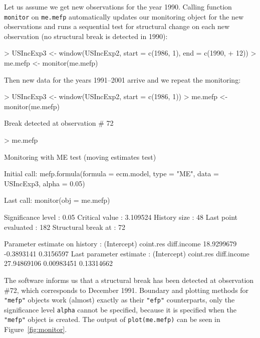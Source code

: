 \documentclass[10pt,a4paper]{article}
\begin{document}
Let us assume we get new observations for the year 1990. Calling function
\texttt{monitor} on \texttt{me.mefp} automatically updates our
monitoring object for the new observations and runs a sequential test
for structural change on each new observation (no structural break is
detected in 1990):
\begin{Schunk}
\begin{Sinput}
> USIncExp3 <- window(USIncExp2, start = c(1986, 1), end = c(1990, 
+     12))
> me.mefp <- monitor(me.mefp)
\end{Sinput}
\end{Schunk}
Then new data for the years 1991--2001 arrive and we repeat the
monitoring:
\begin{Schunk}
\begin{Sinput}
> USIncExp3 <- window(USIncExp2, start = c(1986, 1))
> me.mefp <- monitor(me.mefp)
\end{Sinput}
\begin{Soutput}
Break detected at observation # 72 
\end{Soutput}
\begin{Sinput}
> me.mefp
\end{Sinput}
\begin{Soutput}
Monitoring with ME test (moving estimates test) 

Initial call:
  mefp.formula(formula = ecm.model, type = "ME", data = USIncExp3,      alpha = 0.05) 

Last call:
  monitor(obj = me.mefp) 

Significance level   :  0.05 
Critical value       :  3.109524 
History size         :  48 
Last point evaluated :  182 
Structural break at  :  72 

Parameter estimate on history :
(Intercept)   coint.res diff.income 
 18.9299679  -0.3893141   0.3156597 
Last parameter estimate :
(Intercept)   coint.res diff.income 
27.94869106  0.00983451  0.13314662 
\end{Soutput}
\end{Schunk}
The software informs us that a structural break has been detected at
observation \#72, which corresponds to December 1991. Boundary and
plotting methods for \texttt{"mefp"} objects work (almost) exactly as
their \texttt{"efp"} counterparts, only the significance level
\texttt{alpha} cannot be specified, because it is specified when the
\texttt{"mefp"} object is created. The output of
\texttt{plot(me.mefp)} can be seen in Figure~\ref{fig:monitor}.
\end{document}
